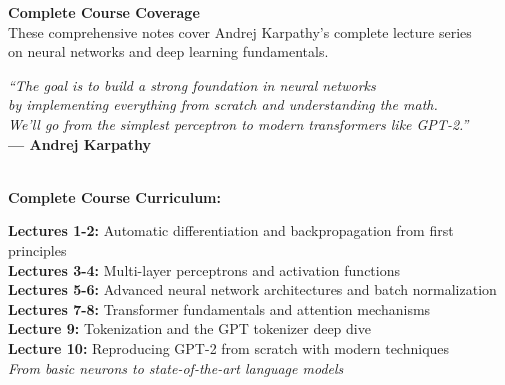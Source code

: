 \documentclass[11pt]{article}
\theoremstyle{definition}
\begin{document}
\vfill
\begin{center}
\large
\textbf{\color{blue!70!black}Complete Course Coverage}\\[0.4cm]
\normalsize
These comprehensive notes cover Andrej Karpathy's complete lecture series\\
on neural networks and deep learning fundamentals.\\[0.6cm]

\begin{minipage}{0.8\textwidth}
\centering
\textit{\color{blue!60!black}``The goal is to build a strong foundation in neural networks\\
by implementing everything from scratch and understanding the math.\\
We'll go from the simplest perceptron to modern transformers like GPT-2.''}\\[0.4cm]
\textbf{--- Andrej Karpathy}
\end{minipage}\\[0.8cm]

\textbf{\color{blue!70!black}Complete Course Curriculum:}\\[0.3cm]
\begin{minipage}{0.95\textwidth}
\small
\textbf{Lectures 1-2:} Automatic differentiation and backpropagation from first principles\\
\textbf{Lectures 3-4:} Multi-layer perceptrons and activation functions\\
\textbf{Lectures 5-6:} Advanced neural network architectures and batch normalization\\
\textbf{Lectures 7-8:} Transformer fundamentals and attention mechanisms\\
\textbf{Lecture 9:} Tokenization and the GPT tokenizer deep dive\\
\textbf{Lecture 10:} Reproducing GPT-2 from scratch with modern techniques\\[0.3cm]
\textit{From basic neurons to state-of-the-art language models}
\end{minipage}
\end{center}
\vfill

\newpage

\renewcommand{\contentsname}{\LARGE\textbf{\color{blue!80!black}Table of Contents}}
\setlength{\cftbeforesecskip}{0.8em}
\setlength{\cftbeforesubsecskip}{0.4em}
\renewcommand{\cftsecfont}{\bfseries\color{blue!70!black}}
\renewcommand{\cftsecpagefont}{\bfseries\color{blue!70!black}}
\renewcommand{\cftsubsecfont}{\color{blue!60!black}}
\renewcommand{\cftsubsecpagefont}{\color{blue!60!black}}

\tableofcontents
\newpage











% 
\end{document}
